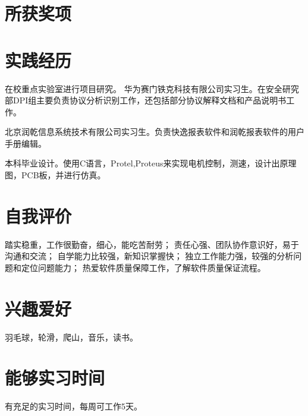 \documentclass[a4paper]{moderncv}
\begin{document}
\begin{CJK*}{UTF8}{gbsn}
\section{所获奖项}
\section{实践经历}
{在校重点实验室进行项目研究。}
{华为赛门铁克科技有限公司实习生。在安全研究部DPI组主要负责协议分析识别工作，还包括部分协议解释文档和产品说明书工作。}

{ 北京润乾信息系统技术有限公司实习生。负责快逸报表软件和润乾报表软件的用户手册编辑。 }

{ 本科毕业设计。使用C语言，Protel,Proteus来实现电机控制，测速，设计出原理图，PCB板，并进行仿真。}

\section{自我评价}
\cvitem{}{}
{
踏实稳重，工作很勤奋，细心，能吃苦耐劳；
责任心强、团队协作意识好，易于沟通和交流；
自学能力比较强，新知识掌握快；
独立工作能力强，较强的分析问题和定位问题能力；
热爱软件质量保障工作，了解软件质量保证流程。
}
\section{兴趣爱好}
\cvitem{}
{
\small 羽毛球，轮滑，爬山，音乐，读书。
}
\section{能够实习时间}
\cvitem{}{}
{
有充足的实习时间，每周可工作5天。
}
\closesection
\end{CJK*}
\end{document}

